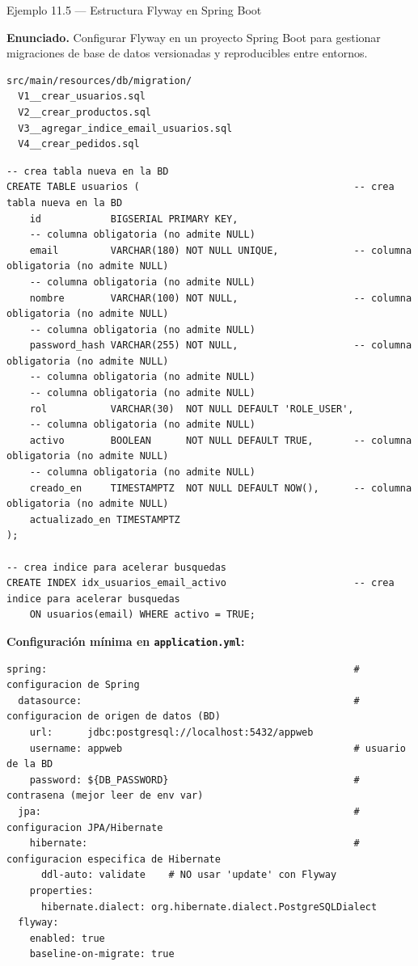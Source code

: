 \documentclass[11pt,a4paper,openany]{book}
\begin{document}
\begin{cajaejemplo}{Ejemplo 11.5 --- Estructura Flyway en Spring Boot}

\textbf{Enunciado.} Configurar Flyway en un proyecto Spring Boot para gestionar migraciones de base de datos versionadas y reproducibles entre entornos.

\begin{lstlisting}[style=shell,numbers=none,caption={Ejemplo de Shell},label=lst:11.12]
src/main/resources/db/migration/
  V1__crear_usuarios.sql
  V2__crear_productos.sql
  V3__agregar_indice_email_usuarios.sql
  V4__crear_pedidos.sql
\end{lstlisting}

\begin{lstlisting}[style=sql,caption={V1\_\_crear\_usuarios.sql},label=lst:11.13]
-- crea tabla nueva en la BD
CREATE TABLE usuarios (                                     -- crea tabla nueva en la BD
    id            BIGSERIAL PRIMARY KEY,
    -- columna obligatoria (no admite NULL)
    email         VARCHAR(180) NOT NULL UNIQUE,             -- columna obligatoria (no admite NULL)
    -- columna obligatoria (no admite NULL)
    nombre        VARCHAR(100) NOT NULL,                    -- columna obligatoria (no admite NULL)
    -- columna obligatoria (no admite NULL)
    password_hash VARCHAR(255) NOT NULL,                    -- columna obligatoria (no admite NULL)
    -- columna obligatoria (no admite NULL)
    -- columna obligatoria (no admite NULL)
    rol           VARCHAR(30)  NOT NULL DEFAULT 'ROLE_USER',
    -- columna obligatoria (no admite NULL)
    activo        BOOLEAN      NOT NULL DEFAULT TRUE,       -- columna obligatoria (no admite NULL)
    -- columna obligatoria (no admite NULL)
    creado_en     TIMESTAMPTZ  NOT NULL DEFAULT NOW(),      -- columna obligatoria (no admite NULL)
    actualizado_en TIMESTAMPTZ
);

-- crea indice para acelerar busquedas
CREATE INDEX idx_usuarios_email_activo                      -- crea indice para acelerar busquedas
    ON usuarios(email) WHERE activo = TRUE;
\end{lstlisting}

\textbf{Configuración mínima en \texttt{application.yml}:}
\begin{lstlisting}[style=yaml,numbers=none,caption={Ejemplo de YAML},label=lst:11.14]
spring:                                                     # configuracion de Spring
  datasource:                                               # configuracion de origen de datos (BD)
    url:      jdbc:postgresql://localhost:5432/appweb
    username: appweb                                        # usuario de la BD
    password: ${DB_PASSWORD}                                # contrasena (mejor leer de env var)
  jpa:                                                      # configuracion JPA/Hibernate
    hibernate:                                              # configuracion especifica de Hibernate
      ddl-auto: validate    # NO usar 'update' con Flyway
    properties:
      hibernate.dialect: org.hibernate.dialect.PostgreSQLDialect
  flyway:
    enabled: true
    baseline-on-migrate: true
\end{lstlisting}
\end{cajaejemplo}
\end{document}
